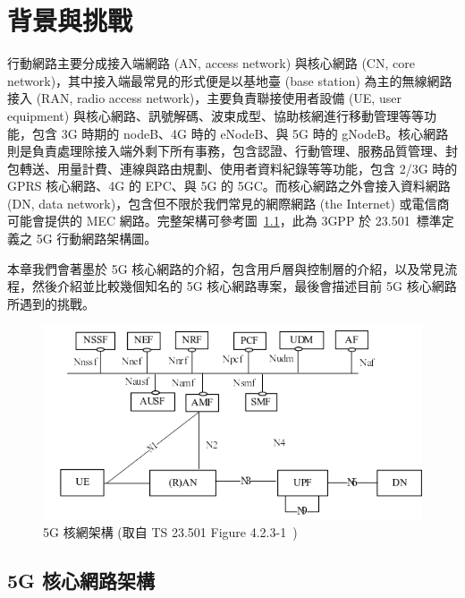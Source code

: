 \chapter{背景與挑戰}
\label{chapter:background}


行動網路主要分成接入端網路 (AN, access network) 與核心網路 (CN, core network)，其中接入端最常見的形式便是以基地臺 (base station) 為主的無線網路接入 (RAN, radio access network)，主要負責聯接使用者設備 (UE, user equipment) 與核心網路、訊號解碼、波束成型、協助核網進行移動管理等等功能，包含 3G 時期的 nodeB、4G 時的 eNodeB、與 5G 時的 gNodeB。核心網路則是負責處理除接入端外剩下所有事務，包含認證、行動管理、服務品質管理、封包轉送、用量計費、連線與路由規劃、使用者資料紀錄等等功能，包含 2/3G 時的 GPRS 核心網路、4G 的 EPC、與 5G 的 5GC。而核心網路之外會接入資料網路 (DN, data network)，包含但不限於我們常見的網際網路 (the Internet) 或電信商可能會提供的 MEC 網路。完整架構可參考圖~\ref{fig:5g_core_arch}，此為 3GPP 於 23.501~\cite{3gpp.23.501}標準定義之 5G 行動網路架構圖。

本章我們會著墨於 5G 核心網路的介紹，包含用戶層與控制層的介紹，以及常見流程，然後介紹並比較幾個知名的 5G 核心網路專案，最後會描述目前 5G 核心網路所遇到的挑戰。

\begin{figure}[htbp]
    \centering
    \includegraphics[height=!,width=1\linewidth,keepaspectratio=true]
                    {figures/23_501_4-2-3-1_sys_arch_sbi}
                    \caption[5G 核網架構]{{\footnotesize 5G 核網架構 (取自 TS 23.501 Figure 4.2.3-1~\cite{3gpp.23.501})}}
                    \label{fig:5g_core_arch}
\end{figure}

\section{5G 核心網路架構}
\label{sec:5g_core}


